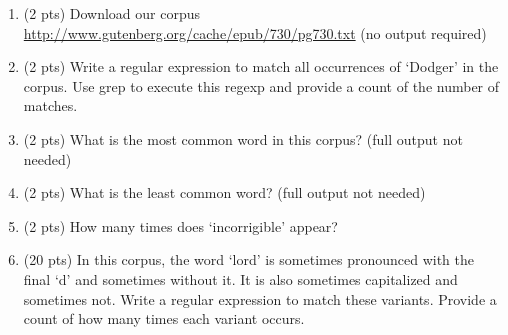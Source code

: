 \documentclass[11pt]{article}
\begin{document}
\begin{enumerate}
     \item (2 pts) Download our corpus \url{http://www.gutenberg.org/cache/epub/730/pg730.txt} (no output required)
     \item (2 pts) Write a regular expression to match all occurrences of `Dodger' in the corpus.  Use grep to execute this regexp and provide a count of the number of matches.
     \item (2 pts) What is the most common word in this corpus? (full output not needed)
     \item (2 pts) What is the least common word? (full output not needed)
     \item (2 pts) How many times does `incorrigible' appear?
     \item (20 pts) In this corpus, the word `lord' is sometimes pronounced with the final `d' and sometimes without it.  It is also sometimes capitalized and sometimes not.  Write a regular expression to match these variants.  Provide a count of how many times each variant occurs.
\end{enumerate}
\end{document}
